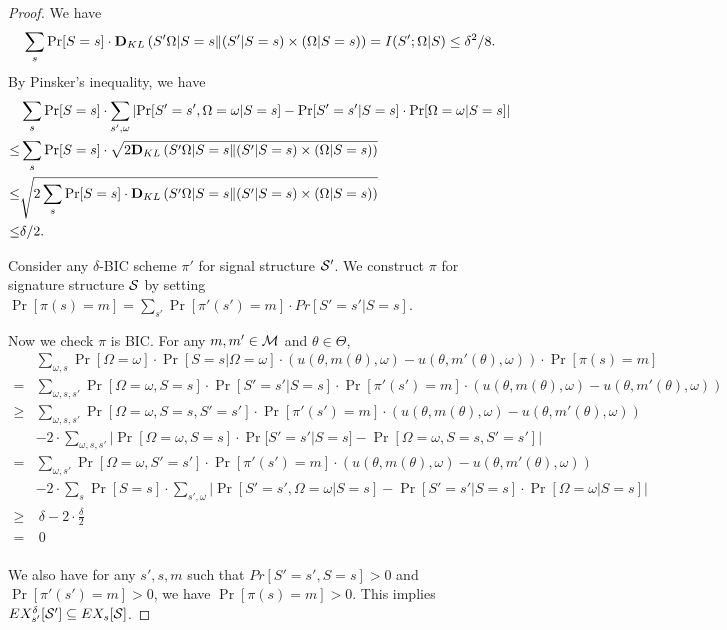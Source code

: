 \begin{proof}
We have 
\[
\sum_{s} \Pr[S=s] \cdot \DKL\left(S'\Omega|S=s \| (S'|S=s) \times (\Omega|S=s) \right) = I(S' ; \Omega|S) \leq \delta^2/8. 
\]
By Pinsker's inequality, we have
\begin{align*}
       &\sum_{s} \Pr[S = s] \cdot  \sum_{s', \omega} \left| \Pr[S' = s', \Omega = \omega| S= s] - \Pr[S'=s'|S=s] \cdot \Pr[\Omega = \omega|S=s]\right| \\
\leq & \sum_{s} \Pr[S=s] \cdot \sqrt{2 \DKL\left(S'\Omega|S=s \| (S'|S=s) \times (\Omega|S=s) \right)  } \\
\leq &  \sqrt{2 \sum_{s} \Pr[S=s] \cdot  \DKL\left(S'\Omega|S=s \| (S'|S=s) \times (\Omega|S=s) \right) } \\
\leq &\delta /2. \\
\end{align*}

Consider any $\delta$-BIC scheme $\pi'$ for signal structure $\S'$. We construct $\pi$ for signature structure $\S$ by setting $\Pr[\pi(s) = m] = \sum_{s'} \Pr[\pi'(s') = m] \cdot Pr[S' = s'|S = s]$. 

Now we check $\pi$ is BIC. For any $m,m' \in \M$ and $\theta \in \varTheta$,
\begin{align*}
& \sum_{\omega,s} \Pr[\Omega= \omega] \cdot \Pr[S = s | \Omega = \omega] \cdot \left(u(\theta, m(\theta), \omega) - u(\theta, m'(\theta), \omega)\right) \cdot  \Pr[\pi(s) = m] \\
=&\sum_{\omega,s,s'} \Pr[\Omega = \omega, S = s] \cdot \Pr[ S'=s'|S= s] \cdot \Pr[\pi'(s') = m]   \cdot \left(u(\theta, m(\theta), \omega) - u(\theta, m'(\theta), \omega)\right)\\
\geq &\sum_{\omega,s,s'} \Pr[\Omega = \omega, S = s, S'=s'] \cdot \Pr[\pi'(s') = m]   \cdot \left(u(\theta, m(\theta), \omega) - u(\theta, m'(\theta),
 \omega)\right)\\
& -2 \cdot \sum_{\omega,s,s'} | \Pr[\Omega = \omega, S = s] \cdot \Pr[ S'=s'|S= s] -  \Pr[\Omega = \omega, S = s, S'=s']| \\
= &\sum_{\omega,s'} \Pr[\Omega = \omega, S'=s'] \cdot \Pr[\pi'(s') = m]   \cdot \left(u(\theta, m(\theta), \omega) - u(\theta, m'(\theta),
 \omega)\right)\\
& -2 \cdot \sum_{s} \Pr[S = s] \cdot  \sum_{s', \omega} \left| \Pr[S' = s', \Omega = \omega| S= s] - \Pr[S'=s'|S=s] \cdot \Pr[\Omega = \omega|S=s]\right| \\
\geq&  ~\delta - 2 \cdot \frac{\delta}{2}\\
 =& ~0\\
\end{align*}

We also have for any $s', s ,m$ such that $Pr[S' = s',S = s] >0 $ and $\Pr[\pi'(s') = m] >0$, we have $\Pr[\pi(s) = m] > 0$. This implies $\EX^{\delta}_{s'}[\S'] \subseteq \EX_s[\S]$. 
\end{proof}


